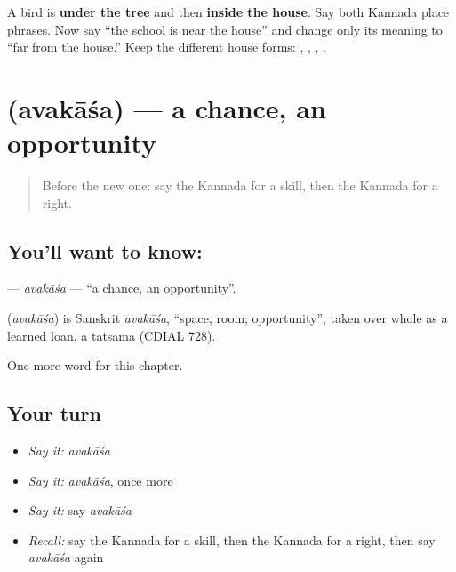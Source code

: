 \begin{tcolorbox}[breakable,colback=teal!4,colframe=teal!35!black,title={Before you move on}]
A bird is \textbf{under the tree} and then \textbf{inside the house}. Say both Kannada place phrases. Now say “the school is near the house” and change only its meaning to “far from the house.” Keep the different house forms: \textbf{ }, \textbf{}, \textbf{ }, \textbf{ }.
\end{tcolorbox}
\section[\texorpdfstring{\kn{ಅವಕಾಶ} (avakāśa)}{ಅವಕಾಶ (avakāśa)}]{ (avakāśa) — a chance, an opportunity}

\label{lesson:KA-C112-avakasa}



\begin{quote}
Before the new one: say the Kannada for a skill, then the Kannada for a right.
\end{quote}

\subsection*{You'll want to know: }
\textbf{} — \emph{avakāśa} — \textquotedblleft{}a chance, an opportunity\textquotedblright{}.

\begin{cousinweb}
\textbf{} (\emph{avakāśa}) is Sanskrit \emph{avakāśa}, \textquotedblleft{}space, room; opportunity\textquotedblright{}, taken over whole as a learned loan, a tatsama (CDIAL 728).
\end{cousinweb}

\begin{grammarlens}[title={What you've built}]
One more word for this chapter.
\end{grammarlens}

\subsection*{Your turn}
\begin{itemize}
\raggedright
  \item \emph{Say it:} \emph{avakāśa}
  \item \emph{Say it:} \emph{avakāśa}, once more
  \item \emph{Say it:} say \emph{avakāśa}
  \item \emph{Recall:} say the Kannada for a skill, then the Kannada for a right, then say \emph{avakāśa} again
\end{itemize}

